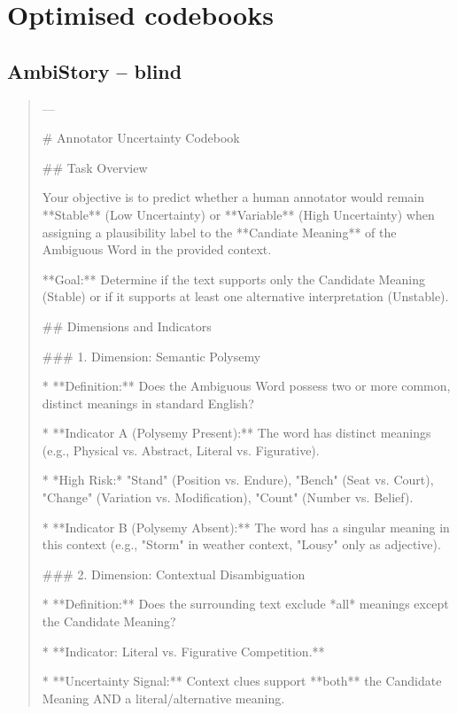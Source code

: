 \section{Optimised codebooks}
\label{app:codebooks}
\subsection*{AmbiStory -- blind}
\begin{quote}\small
---



# Annotator Uncertainty Codebook



## Task Overview

Your objective is to predict whether a human annotator would remain **Stable** (Low Uncertainty) or **Variable** (High Uncertainty) when assigning a plausibility label to the **Candiate Meaning** of the Ambiguous Word in the provided context.



**Goal:** Determine if the text supports only the Candidate Meaning (Stable) or if it supports at least one alternative interpretation (Unstable).



## Dimensions and Indicators



### 1. Dimension: Semantic Polysemy

*   **Definition:** Does the Ambiguous Word possess two or more common, distinct meanings in standard English?

*   **Indicator A (Polysemy Present):** The word has distinct meanings (e.g., Physical vs. Abstract, Literal vs. Figurative).

    *   *High Risk:* "Stand" (Position vs. Endure), "Bench" (Seat vs. Court), "Change" (Variation vs. Modification), "Count" (Number vs. Belief).

*   **Indicator B (Polysemy Absent):** The word has a singular meaning in this context (e.g., "Storm" in weather context, "Lousy" only as adjective).



### 2. Dimension: Contextual Disambiguation

*   **Definition:** Does the surrounding text exclude *all* meanings except the Candidate Meaning?

*   **Indicator: Literal vs. Figurative Competition.**

    *   **Uncertainty Signal:** Context clues support **both** the Candidate Meaning AND a literal/alternative meaning.


\end{quote}
